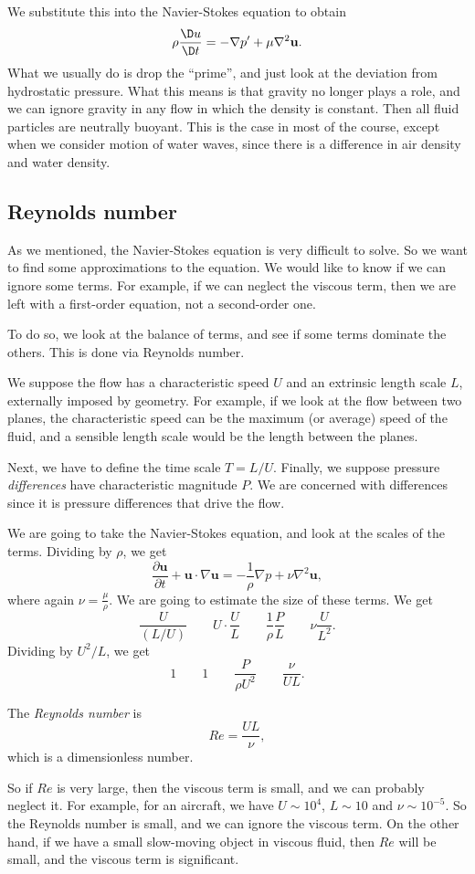 \documentclass[a4paper]{article}
\begin{document}
We substitute this into the Navier-Stokes equation to obtain
\[
  \rho \frac{\D u}{\D t} = -\nabla p' + \mu \nabla^2 \mathbf{u}.
\]
What we usually do is drop the ``prime'', and just look at the deviation from hydrostatic pressure. What this means is that gravity no longer plays a role, and we can ignore gravity in any flow in which the density is constant. Then all fluid particles are neutrally buoyant. This is the case in most of the course, except when we consider motion of water waves, since there is a difference in air density and water density.

\subsection{Reynolds number}
As we mentioned, the Navier-Stokes equation is very difficult to solve. So we want to find some approximations to the equation. We would like to know if we can ignore some terms. For example, if we can neglect the viscous term, then we are left with a first-order equation, not a second-order one.

To do so, we look at the balance of terms, and see if some terms dominate the others. This is done via Reynolds number.

We suppose the flow has a characteristic speed $U$ and an extrinsic length scale $L$, externally imposed by geometry. For example, if we look at the flow between two planes, the characteristic speed can be the maximum (or average) speed of the fluid, and a sensible length scale would be the length between the planes.

Next, we have to define the time scale $T = L/U$. Finally, we suppose pressure \emph{differences} have characteristic magnitude $P$. We are concerned with differences since it is pressure differences that drive the flow.

We are going to take the Navier-Stokes equation, and look at the scales of the terms. Dividing by $\rho$, we get
\[
  \frac{\partial \mathbf{u}}{\partial t} + \mathbf{u}\cdot \nabla \mathbf{u} = -\frac{1}{\rho} \nabla p + \nu \nabla^2 \mathbf{u},
\]
where again $\nu = \frac{\mu}{\rho}$. We are going to estimate the size of these terms. We get
\[
  \frac{U}{(L/U)} \quad\quad U \cdot \frac{U}{L} \quad\quad \frac{1}{\rho} \frac{P}{L} \quad\quad \nu \frac{U}{L^2}.
\]
Dividing by $U^2/L$, we get
\[
  1 \quad\quad 1 \quad\quad \frac{P}{\rho U^2} \quad\quad \frac{\nu}{UL}.
\]
\begin{defi}
  The \emph{Reynolds number} is
  \[
    Re = \frac{UL}{\nu},
  \]
  which is a dimensionless number.
\end{defi}
So if $Re$ is very large, then the viscous term is small, and we can probably neglect it. For example, for an aircraft, we have $U \sim 10^4$, $L \sim 10$ and $\nu \sim 10^{-5}$. So the Reynolds number is small, and we can ignore the viscous term. On the other hand, if we have a small slow-moving object in viscous fluid, then $Re$ will be small, and the viscous term is significant.
\end{document}

